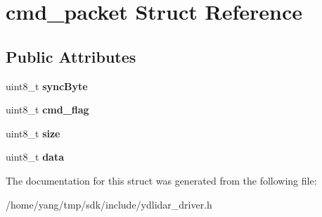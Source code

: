 \hypertarget{structcmd__packet}{}\section{cmd\+\_\+packet Struct Reference}
\label{structcmd__packet}
\subsection*{Public Attributes}
\begin{DoxyCompactItemize}
\item 
uint8\+\_\+t {\bfseries sync\+Byte}\hypertarget{structcmd__packet_afbbf12329459d281e93fc742d1a78009}{}\label{structcmd__packet_afbbf12329459d281e93fc742d1a78009}

\item 
uint8\+\_\+t {\bfseries cmd\+\_\+flag}\hypertarget{structcmd__packet_a87508f8232c382897c9159026985f3eb}{}\label{structcmd__packet_a87508f8232c382897c9159026985f3eb}

\item 
uint8\+\_\+t {\bfseries size}\hypertarget{structcmd__packet_aff384923e9d1d54d526ca755529eac05}{}\label{structcmd__packet_aff384923e9d1d54d526ca755529eac05}

\item 
uint8\+\_\+t {\bfseries data}\hypertarget{structcmd__packet_a3b8820a6357e147dd00ea67d9c9484c0}{}\label{structcmd__packet_a3b8820a6357e147dd00ea67d9c9484c0}

\end{DoxyCompactItemize}


The documentation for this struct was generated from the following file\+:\begin{DoxyCompactItemize}
\item 
/home/yang/tmp/sdk/include/ydlidar\+\_\+driver.\+h\end{DoxyCompactItemize}
